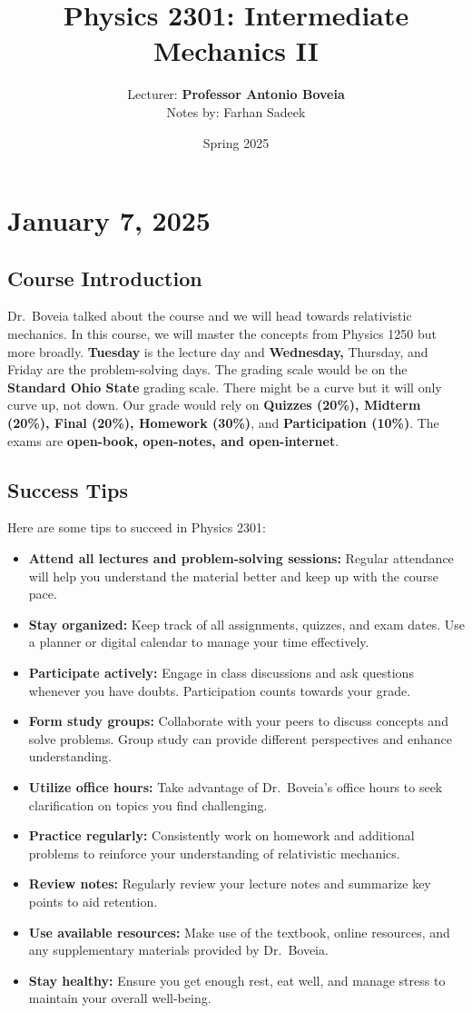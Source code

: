 \documentclass[11pt]{article}
\title{Physics 2301: Intermediate Mechanics II}
\author{Lecturer: \textbf{Professor Antonio Boveia}\\Notes by: Farhan Sadeek}
\date{Spring 2025}
\begin{document}
\maketitle

\section{January 7, 2025}
\subsection{Course Introduction}

Dr.\ Boveia talked about the course and we will head towards relativistic mechanics. In this course, we will master the concepts from Physics 1250 but more broadly. \textbf{Tuesday} is the lecture day and \textbf{Wednesday,} Thursday, and Friday are the problem-solving days. The grading scale would be on the \textbf{Standard Ohio State} grading scale. There might be a curve but it will only curve up, not down. Our grade would rely on \textbf{Quizzes (20\%), Midterm (20\%), Final (20\%), Homework (30\%)}, and \textbf{Participation (10\%)}. The exams are \textbf{open-book, open-notes, and open-internet}.

\subsection{Success Tips}
Here are some tips to succeed in Physics 2301:
\begin{itemize}
    \item \textbf{Attend all lectures and problem-solving sessions:} Regular attendance will help you understand the material better and keep up with the course pace.
    \item \textbf{Stay organized:} Keep track of all assignments, quizzes, and exam dates. Use a planner or digital calendar to manage your time effectively.
    \item \textbf{Participate actively:} Engage in class discussions and ask questions whenever you have doubts. Participation counts towards your grade.
    \item \textbf{Form study groups:} Collaborate with your peers to discuss concepts and solve problems. Group study can provide different perspectives and enhance understanding.
    \item \textbf{Utilize office hours:} Take advantage of Dr.\ Boveia's office hours to seek clarification on topics you find challenging.
    \item \textbf{Practice regularly:} Consistently work on homework and additional problems to reinforce your understanding of relativistic mechanics.
    \item \textbf{Review notes:} Regularly review your lecture notes and summarize key points to aid retention.
    \item \textbf{Use available resources:} Make use of the textbook, online resources, and any supplementary materials provided by Dr.\ Boveia.
    \item \textbf{Stay healthy:} Ensure you get enough rest, eat well, and manage stress to maintain your overall well-being.
\end{itemize}
\end{document}
